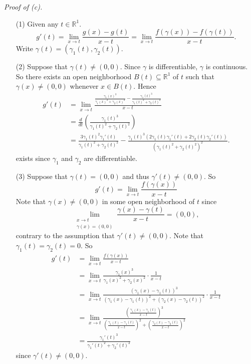 \documentclass{article}
\begin{document}
\emph{Proof of (c).}
\begin{enumerate}
\item[(1)]
  Given any $t \in \mathbb{R}^1$.
  \[
    g'(t)
    = \lim_{x \to t} \frac{g(x)-g(t)}{x-t}
    = \lim_{x \to t} \frac{f(\gamma(x))-f(\gamma(t))}{x-t}.
  \]
  Write $\gamma(t) = (\gamma_1(t),\gamma_2(t))$.

\item[(2)]
  Suppose that $\gamma(t) \neq (0,0)$.
  Since $\gamma$ is differentiable, $\gamma$ is continuous.
  So there exists an open neighborhood $B(t) \subseteq \mathbb{R}^1$ of $t$
  such that $\gamma(x) \neq (0,0)$ whenever $x \in B(t)$.
  Hence
  \begin{align*}
    g'(t)
    &= \lim_{x \to t} \frac{\frac{\gamma_1(x)^3}{\gamma_1(x)^2+\gamma_2(x)^2}
      -\frac{\gamma_1(t)^3}{\gamma_1(t)^2+\gamma_2(t)^2}}{x-t} \\
    &= \frac{d}{dt}\left(\frac{\gamma_1(t)^3}{\gamma_1(t)^2+\gamma_2(t)^2}\right) \\
    &= \frac{3\gamma_1(t)^2\gamma_1'(t)}{\gamma_1(t)^2+\gamma_2(t)^2}
      - \frac{\gamma_1(t)^3(2\gamma_1(t)\gamma_1'(t)+2\gamma_2(t)\gamma_2'(t))}
        {(\gamma_1(t)^2+\gamma_2(t)^2)^2}.
  \end{align*}
  exists
  since $\gamma_1$ and $\gamma_2$ are differentiable.

\item[(3)]
  Suppose that $\gamma(t) = (0,0)$ and thus $\gamma'(t) \neq (0,0)$.
  So
  \[
    g'(t) = \lim_{x \to t} \frac{f(\gamma(x))}{x-t}
  \]
  Note that $\gamma(x) \neq (0,0)$ in some open neighborhood of $t$
  since
  \[
    \lim_{\substack{x \to t \\ \gamma(x) = (0,0)}} \frac{\gamma(x) - \gamma(t)}{x-t}
    = (0,0),
  \]
  contrary to the assumption that $\gamma'(t) \neq (0,0)$.
  Note that $\gamma_1(t) = \gamma_2(t) = 0$.
  So
  \begin{align*}
    g'(t)
    &= \lim_{x \to t} \frac{f(\gamma(x))}{x-t} \\
    &= \lim_{x \to t}
      \frac{\gamma_1(x)^3}{\gamma_1(x)^2+\gamma_2(x)^2}
      \cdot \frac{1}{x-t} \\
    &= \lim_{x \to t}
      \frac{(\gamma_1(x)-\gamma_1(t))^3}
        {(\gamma_1(x)-\gamma_1(t))^2+(\gamma_2(x)-\gamma_2(t))^2}
      \cdot \frac{1}{x-t} \\
    &= \lim_{x \to t}
      \frac{\left(\frac{\gamma_1(x)-\gamma_1(t)}{x-t}\right)^3}
        {\left(\frac{\gamma_1(x)-\gamma_1(t)}{x-t}\right)^2
        +\left(\frac{\gamma_2(x)-\gamma_2(t)}{x-t}\right)^2} \\
    &= \frac{\gamma_1'(t)^3}{\gamma_1'(t)^2+\gamma_2'(t)^2}
  \end{align*}
  since $\gamma'(t) \neq (0,0)$.


\end{enumerate}
\end{document}
